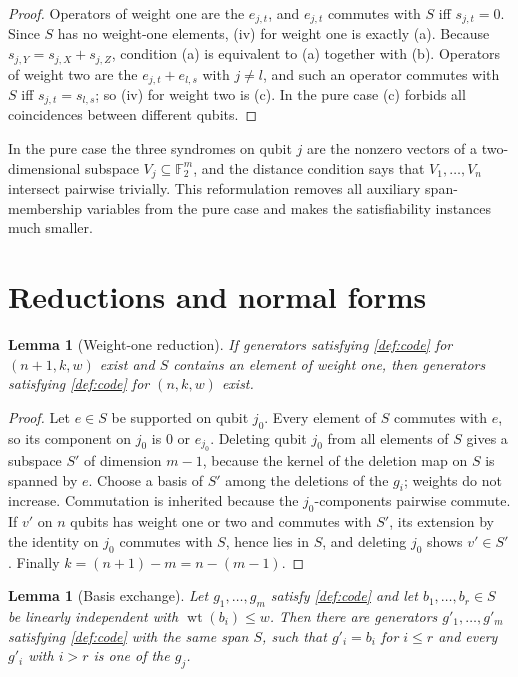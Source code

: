 \documentclass[a4paper,onecolumn,unpublished]{quantumarticle}
\newtheorem{lemma}[theorem]{Lemma}
\theoremstyle{definition}
\theoremstyle{remark}
\newcommand{\F}{\mathbb{F}_2}
\newcommand{\wt}{\operatorname{wt}}
\begin{document}
\begin{proof}
Operators of weight one are the $e_{j,t}$, and $e_{j,t}$ commutes with $S$ iff $s_{j,t}=0$.
Since $S$ has no weight-one elements, (iv) for weight one is exactly (a). Because
$s_{j,Y}=s_{j,X}+s_{j,Z}$, condition (a) is equivalent to (a) together with (b). Operators of
weight two are the $e_{j,t}+e_{l,s}$ with $j\ne l$, and such an operator commutes with $S$ iff
$s_{j,t}=s_{l,s}$; so (iv) for weight two is (c). In the pure case (c) forbids all coincidences
between different qubits.
\end{proof}

In the pure case the three syndromes on qubit $j$ are the nonzero vectors of a two-dimensional
subspace $V_j\subseteq\F^m$, and the distance condition says that $V_1,\dots,V_n$ intersect
pairwise trivially. This reformulation removes all auxiliary span-membership variables from the
pure case and makes the satisfiability instances much smaller.

\section{Reductions and normal forms}
\label{sec:reductions}

\begin{lemma}[Weight-one reduction]
\label{lem:reduce}
If generators satisfying \cref{def:code} for $(n+1,k,w)$ exist and $S$ contains an element of
weight one, then generators satisfying \cref{def:code} for $(n,k,w)$ exist.
\end{lemma}

\begin{proof}
Let $e\in S$ be supported on qubit $j_0$. Every element of $S$ commutes with $e$, so its component
on $j_0$ is $0$ or $e_{j_0}$. Deleting qubit $j_0$ from all elements of $S$ gives a subspace $S'$ of
dimension $m-1$, because the kernel of the deletion map on $S$ is spanned by $e$. Choose a basis of
$S'$ among the deletions of the $g_i$; weights do not increase. Commutation is inherited because
the $j_0$-components pairwise commute. If $v'$ on $n$ qubits has weight one or two and commutes
with $S'$, its extension by the identity on $j_0$ commutes with $S$, hence lies in $S$, and
deleting $j_0$ shows $v'\in S'$. Finally $k=(n+1)-m=n-(m-1)$.
\end{proof}

\begin{lemma}[Basis exchange]
\label{lem:exchange}
Let $g_1,\dots,g_m$ satisfy \cref{def:code} and let $b_1,\dots,b_r\in S$ be linearly independent
with $\wt(b_i)\le w$. Then there are generators $g'_1,\dots,g'_m$ satisfying \cref{def:code} with
the same span $S$, such that $g'_i=b_i$ for $i\le r$ and every $g'_i$ with $i>r$ is one of the
$g_j$.
\end{lemma}
\end{document}
